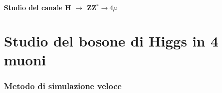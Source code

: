 \documentclass{beamer}
\begin{document}
\section{}
\begin{frame}
\begin{center}
\huge{\textbf{\color{dred} Studio del canale H \boldmath$\rightarrow$ ZZ$^{*} \rightarrow 4\mu$}}
\end{center}
\end{frame}

\section{Studio del bosone di Higgs in 4 muoni}

\begin{frame}[t]
\frametitle{Metodo di simulazione veloce}


\end{frame}
\end{document}
